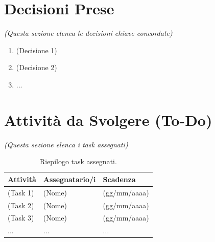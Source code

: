 \documentclass[a4paper, 11pt, oneside]{scrartcl} %
\begin{document}
\newpage
\section{Decisioni Prese}
\emph{(Questa sezione elenca le decisioni chiave concordate)}

\begin{enumerate}
    \item (Decisione 1)
    \item (Decisione 2)
    \item ...
\end{enumerate}

\newpage
\section{Attività da Svolgere (To-Do)}
\emph{(Questa sezione elenca i task assegnati)}

\begin{table}[h!]
\centering
\begin{tabular}{@{}lll@{}}
\toprule
\textbf{Attività} & \textbf{Assegnatario/i} & \textbf{Scadenza} \\
\midrule
(Task 1) & (Nome) & (gg/mm/aaaa) \\
(Task 2) & (Nome) & (gg/mm/aaaa) \\
(Task 3) & (Nome) & (gg/mm/aaaa) \\
... & ... & ... \\
\bottomrule
\end{tabular}
\caption{Riepilogo task assegnati.}
\end{table}
\end{document}

